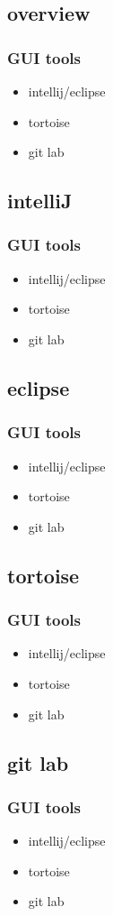 \subsection{overview}
\begin{frame}
\frametitle{GUI tools}
	\begin{block}{}
		\begin{itemize}
			\item intellij/eclipse
			\item tortoise
			\item git lab
		\end{itemize}
	\end{block}
\end{frame}

\subsection{intelliJ}
\begin{frame}
\frametitle{GUI tools}
	\begin{block}{}
		\begin{itemize}
			\item intellij/eclipse
			\item tortoise
			\item git lab
		\end{itemize}
	\end{block}
\end{frame}
\subsection{eclipse}
\begin{frame}
\frametitle{GUI tools}
	\begin{block}{}
		\begin{itemize}
			\item intellij/eclipse
			\item tortoise
			\item git lab
		\end{itemize}
	\end{block}
\end{frame}
\subsection{tortoise}
\begin{frame}
\frametitle{GUI tools}
	\begin{block}{}
		\begin{itemize}
			\item intellij/eclipse
			\item tortoise
			\item git lab
		\end{itemize}
	\end{block}
\end{frame}
\subsection{git lab}
\begin{frame}
\frametitle{GUI tools}
	\begin{block}{}
		\begin{itemize}
			\item intellij/eclipse
			\item tortoise
			\item git lab
		\end{itemize}
	\end{block}
\end{frame}
